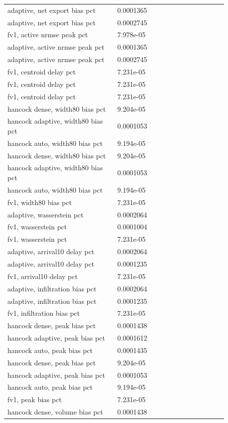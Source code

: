 \begin{longtable}{p{0.4400\linewidth}p{0.4400\linewidth}}
adaptive, net export bias pct & 0.0001365 \\
adaptive, net export bias pct & 0.0002745 \\
fv1, active nrmse peak pct & 7.978e-05 \\
adaptive, active nrmse peak pct & 0.0001365 \\
adaptive, active nrmse peak pct & 0.0002745 \\
fv1, centroid delay pct & 7.231e-05 \\
fv1, centroid delay pct & 7.231e-05 \\
fv1, centroid delay pct & 7.231e-05 \\
hancock dense, width80 bias pct & 9.204e-05 \\
hancock adaptive, width80 bias pct & 0.0001053 \\
hancock auto, width80 bias pct & 9.194e-05 \\
hancock dense, width80 bias pct & 9.204e-05 \\
hancock adaptive, width80 bias pct & 0.0001053 \\
hancock auto, width80 bias pct & 9.194e-05 \\
fv1, width80 bias pct & 7.231e-05 \\
adaptive, wasserstein pct & 0.0002064 \\
fv1, wasserstein pct & 0.0001004 \\
fv1, wasserstein pct & 7.231e-05 \\
adaptive, arrival10 delay pct & 0.0002064 \\
adaptive, arrival10 delay pct & 0.0001235 \\
fv1, arrival10 delay pct & 7.231e-05 \\
adaptive, infiltration bias pct & 0.0002064 \\
adaptive, infiltration bias pct & 0.0001235 \\
fv1, infiltration bias pct & 7.231e-05 \\
hancock dense, peak bias pct & 0.0001438 \\
hancock adaptive, peak bias pct & 0.0001612 \\
hancock auto, peak bias pct & 0.0001435 \\
hancock dense, peak bias pct & 9.204e-05 \\
hancock adaptive, peak bias pct & 0.0001053 \\
hancock auto, peak bias pct & 9.194e-05 \\
fv1, peak bias pct & 7.231e-05 \\
hancock dense, volume bias pct & 0.0001438 \\

\end{longtable}
